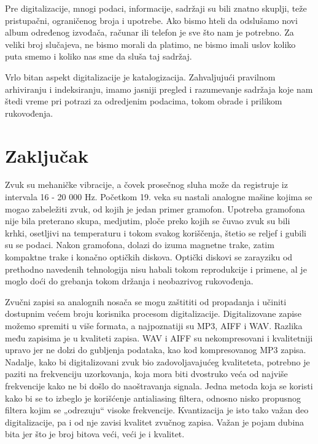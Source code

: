 \documentclass[a4paper]{article}
\begin{document}
Pre digitalizacije, mnogi podaci, informacije, sadržaji su bili znatno skuplji, teže pristupačni, ograničenog broja i upotrebe. Ako bismo hteli da odslušamo novi album određenog izvođača, računar ili telefon je sve što nam je potrebno. Za veliki broj slučajeva, ne bismo morali da platimo, ne bismo imali uslov koliko puta smemo i koliko nas sme da sluša taj sadržaj. 
 
Vrlo bitan aspekt digitalizacije je katalogizacija. Zahvaljujući pravilnom arhiviranju i indeksiranju, imamo jasniji pregled i razumevanje sadržaja koje nam štedi vreme pri potrazi za odredjenim podacima, tokom obrade i prilikom rukovođenja\cite{jurkovic2021digitalizacija}.

\section{Zaključak}
\label{sec:zakljucak}

Zvuk su mehaničke vibracije, a čovek prosečnog sluha može da registruje iz intervala 16 - 20 000 Hz. Početkom 19. veka su nastali analogne mašine kojima se mogao zabeležiti zvuk, od kojih je jedan primer gramofon. Upotreba gramofona nije bila preterano skupa, medjutim, ploče preko kojih se čuvao zvuk su bili krhki, osetljivi na temperaturu i tokom svakog koriščenja, štetio se reljef i gubili su se podaci. Nakon gramofona, dolazi do izuma magnetne trake, zatim kompaktne trake i konačno optičkih diskova. Optički diskovi se zarayziku od prethodno navedenih tehnologija nisu habali tokom reprodukcije i primene, al je moglo doći do grebanja tokom držanja i neobazrivog rukovođenja.

Zvučni zapisi sa analognih nosača se mogu  zaštititi od propadanja i učiniti dostupnim većem broju korisnika procesom digitalizacije. Digitalizovane zapise možemo spremiti u više
formata, a najpoznatiji su MP3, AIFF i WAV. Razlika među zapisima je u kvaliteti zapisa. WAV i AIFF su nekompresovani i kvalitetniji upravo jer ne dolzi do gubljenja podataka, kao kod kompresovanog MP3 zapisa. Nadalje, kako bi digitalizovani
zvuk bio zadovoljavajućeg kvaliteteta, potrebno je paziti na frekvenciju uzorkovanja, koja mora biti dvostruko veća od najviše frekvencije kako ne bi došlo do naoštravanja signala. Jedna metoda koja se koristi kako bi se to izbeglo je korišćenje antialiasing filtera, odnosno nisko
propusnog filtera kojim se „odrezuju“ visoke frekvencije. Kvantizacija je isto tako važan deo digitalizacije, pa i od nje zavisi kvalitet zvučnog zapisa. Važan je pojam dubina bita jer što je broj bitova veći, veći je i kvalitet.
\end{document}
